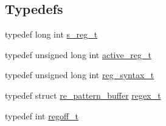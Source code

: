 \subsection*{Typedefs}
\begin{DoxyCompactItemize}
\item 
typedef long int \hyperlink{a00092_abff5b09317105393a360722335c024a2}{s\+\_\+reg\+\_\+t}
\item 
typedef unsigned long int \hyperlink{a00092_ab64c4b3b9990d5c9e7e30219aecec37a}{active\+\_\+reg\+\_\+t}
\item 
typedef unsigned long int \hyperlink{a00092_a7e0565199a2fabaca3d67a5a44fc4229}{reg\+\_\+syntax\+\_\+t}
\item 
typedef struct \hyperlink{a00686}{re\+\_\+pattern\+\_\+buffer} \hyperlink{a00092_a159f97bcead74ee31a0817571f7625a9}{regex\+\_\+t}
\item 
typedef int \hyperlink{a00092_a5b34995b47432512ee4ffa32b836e65f}{regoff\+\_\+t}
\end{DoxyCompactItemize}
